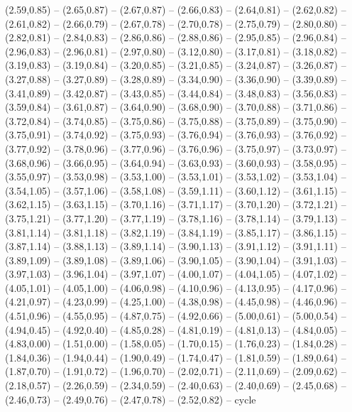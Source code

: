 \expandafter\def\csname geo:gebiet:CHE\endcsname{
  (2.59,0.85) -- (2.65,0.87) -- (2.67,0.87) -- (2.66,0.83) -- (2.64,0.81) -- (2.62,0.82) -- (2.61,0.82) -- (2.66,0.79) -- (2.67,0.78) -- (2.70,0.78) -- (2.75,0.79) -- (2.80,0.80) -- (2.82,0.81) -- (2.84,0.83) -- (2.86,0.86) -- (2.88,0.86) -- (2.95,0.85) -- (2.96,0.84) -- (2.96,0.83) -- (2.96,0.81) -- (2.97,0.80) -- (3.12,0.80) -- (3.17,0.81) -- (3.18,0.82) -- (3.19,0.83) -- (3.19,0.84) -- (3.20,0.85) -- (3.21,0.85) -- (3.24,0.87) -- (3.26,0.87) -- (3.27,0.88) -- (3.27,0.89) -- (3.28,0.89) -- (3.34,0.90) -- (3.36,0.90) -- (3.39,0.89) -- (3.41,0.89) -- (3.42,0.87) -- (3.43,0.85) -- (3.44,0.84) -- (3.48,0.83) -- (3.56,0.83) -- (3.59,0.84) -- (3.61,0.87) -- (3.64,0.90) -- (3.68,0.90) -- (3.70,0.88) -- (3.71,0.86) -- (3.72,0.84) -- (3.74,0.85) -- (3.75,0.86) -- (3.75,0.88) -- (3.75,0.89) -- (3.75,0.90) -- (3.75,0.91) -- (3.74,0.92) -- (3.75,0.93) -- (3.76,0.94) -- (3.76,0.93) -- (3.76,0.92) -- (3.77,0.92) -- (3.78,0.96) -- (3.77,0.96) -- (3.76,0.96) -- (3.75,0.97) -- (3.73,0.97) -- (3.68,0.96) -- (3.66,0.95) -- (3.64,0.94) -- (3.63,0.93) -- (3.60,0.93) -- (3.58,0.95) -- (3.55,0.97) -- (3.53,0.98) -- (3.53,1.00) -- (3.53,1.01) -- (3.53,1.02) -- (3.53,1.04) -- (3.54,1.05) -- (3.57,1.06) -- (3.58,1.08) -- (3.59,1.11) -- (3.60,1.12) -- (3.61,1.15) -- (3.62,1.15) -- (3.63,1.15) -- (3.70,1.16) -- (3.71,1.17) -- (3.70,1.20) -- (3.72,1.21) -- (3.75,1.21) -- (3.77,1.20) -- (3.77,1.19) -- (3.78,1.16) -- (3.78,1.14) -- (3.79,1.13) -- (3.81,1.14) -- (3.81,1.18) -- (3.82,1.19) -- (3.84,1.19) -- (3.85,1.17) -- (3.86,1.15) -- (3.87,1.14) -- (3.88,1.13) -- (3.89,1.14) -- (3.90,1.13) -- (3.91,1.12) -- (3.91,1.11) -- (3.89,1.09) -- (3.89,1.08) -- (3.89,1.06) -- (3.90,1.05) -- (3.90,1.04) -- (3.91,1.03) -- (3.97,1.03) -- (3.96,1.04) -- (3.97,1.07) -- (4.00,1.07) -- (4.04,1.05) -- (4.07,1.02) -- (4.05,1.01) -- (4.05,1.00) -- (4.06,0.98) -- (4.10,0.96) -- (4.13,0.95) -- (4.17,0.96) -- (4.21,0.97) -- (4.23,0.99) -- (4.25,1.00) -- (4.38,0.98) -- (4.45,0.98) -- (4.46,0.96) -- (4.51,0.96) -- (4.55,0.95) -- (4.87,0.75) -- (4.92,0.66) -- (5.00,0.61) -- (5.00,0.54) -- (4.94,0.45) -- (4.92,0.40) -- (4.85,0.28) -- (4.81,0.19) -- (4.81,0.13) -- (4.84,0.05) -- (4.83,0.00) -- (1.51,0.00) -- (1.58,0.05) -- (1.70,0.15) -- (1.76,0.23) -- (1.84,0.28) -- (1.84,0.36) -- (1.94,0.44) -- (1.90,0.49) -- (1.74,0.47) -- (1.81,0.59) -- (1.89,0.64) -- (1.87,0.70) -- (1.91,0.72) -- (1.96,0.70) -- (2.02,0.71) -- (2.11,0.69) -- (2.09,0.62) -- (2.18,0.57) -- (2.26,0.59) -- (2.34,0.59) -- (2.40,0.63) -- (2.40,0.69) -- (2.45,0.68) -- (2.46,0.73) -- (2.49,0.76) -- (2.47,0.78) -- (2.52,0.82) -- cycle}
